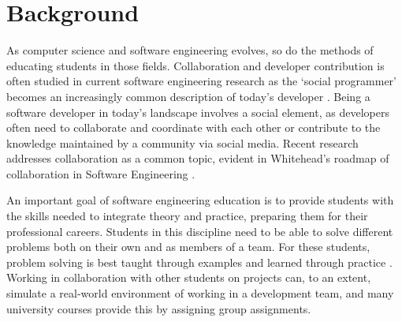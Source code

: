 

\chapter{Background}
As computer science and software engineering evolves, so do the methods of educating students in those fields. Collaboration and developer contribution is often studied in current software engineering research as the `social programmer' becomes an increasingly common description of today's developer \cite{treude2012programming}. Being a software developer in today's landscape involves a social element, as developers often need to collaborate and coordinate with each other or contribute to the knowledge maintained by a community via social media. Recent research addresses collaboration as a common topic, evident in Whitehead's roadmap of collaboration in Software Engineering \cite{whitehead2007collaboration}.

An important goal of software engineering education is to provide students with the skills needed to integrate theory and practice, preparing them for their professional careers. Students in this discipline need to be able to solve different problems both on their own and as members of a team. For these students, problem solving is best taught through examples and learned through practice \cite{jazayeri2004education}. Working in collaboration with other students on projects can, to an extent, simulate a real-world environment of working in a development team, and many university courses provide this by assigning group assignments.

